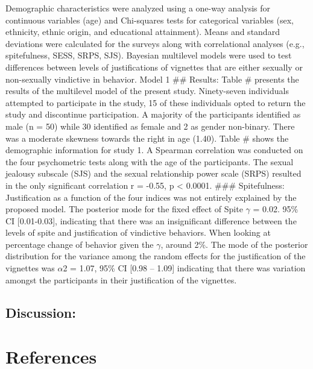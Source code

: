\documentclass[
  english,
  donotrepeattitle,doc, 12pt, a4paper,floatsintext]{apa7}
\begin{document}
Demographic characteristics were analyzed using a one-way analysis for continuous variables (age) and Chi-squares tests for categorical variables (sex, ethnicity, ethnic origin, and educational attainment). Means and standard deviations were calculated for the surveys along with correlational analyses (e.g., spitefulness, SESS, SRPS, SJS). Bayesian multilevel models were used to test differences between levels of justifications of vignettes that are either sexually or non-sexually vindictive in behavior. Model 1
\#\# Results:
Table \# presents the results of the multilevel model of the present study. Ninety-seven individuals attempted to participate in the study, 15 of these individuals opted to return the study and discontinue participation. A majority of the participants identified as male (n = 50) while 30 identified as female and 2 as gender non-binary. There was a moderate skewness towards the right in age (1.40). Table \# shows the demographic information for study 1. A Spearman correlation was conducted on the four psychometric tests along with the age of the participants. The sexual jealousy subscale (SJS) and the sexual relationship power scale (SRPS) resulted in the only significant correlation r = -0.55, p \textless{} 0.0001.
\#\#\# Spitefulness:
Justification as a function of the four indices was not entirely explained by the proposed model. The posterior mode for the fixed effect of Spite \(\gamma\) = 0.02. 95\% CI {[}0.01-0.03{]}, indicating that there was an insignificant difference between the levels of spite and justification of vindictive behaviors. When looking at percentage change of behavior given the \(\gamma\), around 2\%.
The mode of the posterior distribution for the variance among the random effects for the justification of the vignettes was \(\alpha\)2 = 1.07, 95\% CI {[}0.98 -- 1.09{]} indicating that there was variation amongst the participants in their justification of the vignettes.

\hypertarget{discussion}{%
\subsection{Discussion:}\label{discussion}}

\newpage

\newpage

\hypertarget{references}{%
\section{References}\label{references}}
\end{document}
